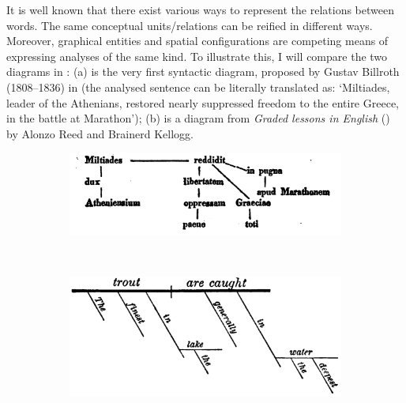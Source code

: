 \documentclass[english,output=paper,colorlinks,citecolor=brown]{../langscibook}
\begin{document}
It is well known that there exist various ways to represent the relations between words. The same conceptual units/relations can be reified in different ways. Moreover, graphical entities and spatial configurations are competing means of expressing analyses of the same kind. To illustrate this, I will compare the two diagrams in : (a) is the very first syntactic diagram, proposed by Gustav Billroth (1808–1836) in \citeyear{Billroth1832} (the analysed sentence can be literally translated as: `Miltiades, leader of the Athenians, restored nearly suppressed freedom to the entire Greece, in the battle at Marathon'); (b) is a diagram from \textit{Graded lessons in English} (\citeyear{ReedBrainerd1879}) by Alonzo Reed and Brainerd Kellogg.

\begin{figure}
	\caption{Various values of strokes\label{fig:4:2}}
	\begin{subfigure}[t]{\linewidth}\centering
	\caption{\label{fig:4:2a}\citealt[102]{Billroth1832}}
	  	\includegraphics[width=.75\textwidth]{figures/04/Billroth.png}
        \end{subfigure}\medskip\\%
        \begin{subfigure}[t]{\linewidth}\centering
		\caption{\label{fig:4:2b}\citealt[62]{ReedBrainerd1879}}
		\includegraphics[width=.75\textwidth]{figures/04/ReedKellog.png}
	\end{subfigure}
\end{figure}
\end{document}
